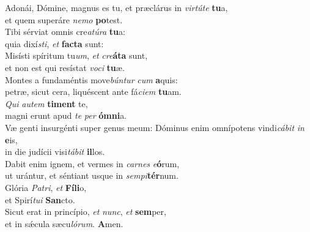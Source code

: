 \evenverse Adonái, Dómine, magnus es tu, et præclárus in \textit{vir}\textit{tú}\textit{te} \textbf{tu}a,~\*\\
\evenverse et quem superáre \textit{ne}\textit{mo} \textbf{po}test.\\
\oddverse Tibi sérviat omnis cre\textit{a}\textit{tú}\textit{ra} \textbf{tu}a:~\*\\
\oddverse quia dixí\textit{sti}, \textit{et} \textbf{fa}\textbf{cta} sunt:\\
\evenverse Misísti spíritum tu\textit{um}, \textit{et} \textit{cre}\textbf{á}\textbf{ta} sunt,~\*\\
\evenverse et non est qui resístat \textit{vo}\textit{ci} \textbf{tu}æ.\\
\oddverse Montes a fundaméntis move\textit{bún}\textit{tur} \textit{cum} \textbf{a}quis:~\*\\
\oddverse petræ, sicut cera, liquéscent ante fá\textit{ci}\textit{em} \textbf{tu}am.\\
\evenverse \textit{Qui} \textit{au}\textit{tem} \textbf{ti}\textbf{ment} te,~\*\\
\evenverse magni erunt apud \textit{te} \textit{per} \textbf{óm}\textbf{ni}a.\\
\oddverse Væ genti insurgénti super genus meum: Dóminus enim omnípotens vindi\textit{cá}\textit{bit} \textit{in} \textbf{e}is,~\*\\
\oddverse in die judícii visi\textit{tá}\textit{bit} \textbf{il}los.\\
\evenverse Dabit enim ignem, et vermes in \textit{car}\textit{nes} \textit{e}\textbf{ó}rum,~\*\\
\evenverse ut urántur, et séntiant usque in \textit{sem}\textit{pi}\textbf{tér}num.\\
\oddverse Glória \textit{Pa}\textit{tri}, \textit{et} \textbf{Fí}\textbf{li}o,~\*\\
\oddverse et Spirí\textit{tu}\textit{i} \textbf{San}cto.\\
\evenverse Sicut erat in princípio, \textit{et} \textit{nunc}, \textit{et} \textbf{sem}per,~\*\\
\evenverse et in sǽcula sæcu\textit{ló}\textit{rum}. \textbf{A}men.\\
